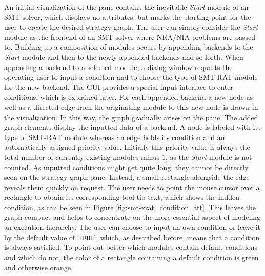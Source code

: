 An initial visualization of the pane contains the inevitable \emph{Start} 
module of an SMT solver, which displays no attributes, but marks the 
starting point for the user to create the desired strategy graph. 
The user can simply consider the \emph{Start} module as the frontend of an 
SMT solver where NRA/NIA problems are passed to. Building up a composition of 
modules occurs by appending backends to the \emph{Start} module and then to 
the newly appended backends and so forth. When appending a backend to a 
selected module, a dialog window requests the operating user to input a 
condition and to choose the type of SMT-RAT module for the new backend. 
The GUI provides a special input interface to enter conditions, which is 
explained later. For each appended backend a new node as well as a directed 
edge from the originating module to this new node is drawn in the visualization. 
In this way, the graph gradually arises on the pane. The added graph elements 
display the inputted data of a backend. A node is labeled with its 
type of SMT-RAT module whereas an edge holds its condition and an automatically 
assigned priority value. Initially this priority value is always the total number 
of currently existing modules minus $1$, as the \emph{Start} module is not 
counted. As inputted conditions might get quite long, they cannot be directly 
seen on the strategy graph pane. Instead, a small rectangle alongside the 
edge reveals them quickly on request. The user needs to point the mouse cursor 
over a rectangle to obtain its corresponding tool tip text, which shows the 
hidden condition, as can be seen in Figure \ref{fig:smt-xrat_condition_ttt}.
This leaves the graph compact and helps to concentrate on the more essential 
aspect of modeling an execution hierarchy. The user can choose to input an 
own condition or leave it by the default value of `\texttt{TRUE}', which, as 
described before, means that a condition is always satisfied. 
To point out better which modules contain default conditions and which do not,
the color of a rectangle containing a default condition is green and otherwise 
orange.

